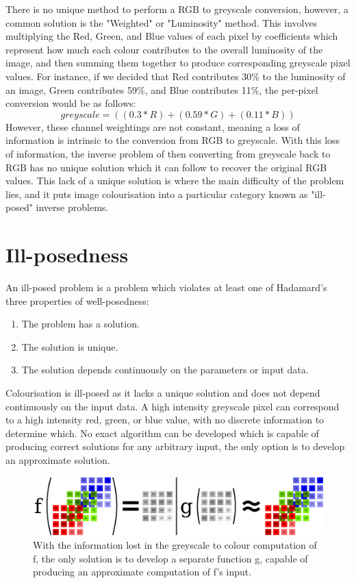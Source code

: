 \documentclass{l4proj}
\begin{document}
There is no unique method to perform a RGB to greyscale conversion, however, a common solution is the "Weighted" or "Luminosity" method. This involves multiplying the Red, Green, and Blue values of each pixel by coefficients which represent how much each colour contributes to the overall luminosity of the image, and then summing them together to produce corresponding greyscale pixel values. For instance, if we decided that Red contributes 30\% to the luminosity of an image, Green contributes 59\%, and Blue contributes 11\%, the per-pixel conversion would be as follows:
\begin{equation}
    greyscale = ((0.3 * R) + (0.59 * G) + (0.11 * B))
\end{equation}
However, these channel weightings are not constant, meaning a loss of information is intrinsic to the conversion from RGB to greyscale. With this loss of information, the inverse problem of then converting from greyscale back to RGB has no unique solution which it can follow to recover the original RGB values. This lack of a unique solution is where the main difficulty of the problem lies, and it puts image colourisation into a particular category known as "ill-posed" inverse problems.


\section{Ill-posedness}
An ill-posed problem is a problem which violates at least one of Hadamard's three properties of well-posedness\cite{Hadamard}:
\begin{enumerate}
    \item The problem has a solution.
    \item The solution is unique.
    \item The solution depends continuously on the parameters or input data.
\end{enumerate}
Colourisation is ill-posed as it lacks a unique solution and does not depend continuously on the input data. A high intensity greyscale pixel can correspond to a high intensity red, green, or blue value, with no discrete information to determine which. No exact algorithm can be developed which is capable of producing correct solutions for any arbitrary input, the only option is to develop an approximate solution.
\begin{figure}[H]
    \centering
    \includegraphics[width=1.0\linewidth]{images/FunctionsHorizontal.png}    

    \caption{With the information lost in the greyscale to colour computation of f, the only solution is to develop a separate function g, capable of producing an approximate computation of f's input.}

    \label{fig:functions} 
\end{figure}
\end{document}
